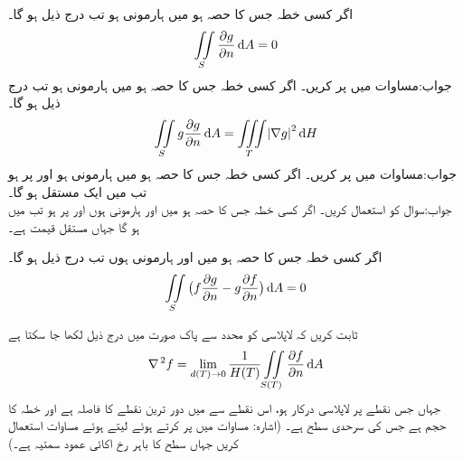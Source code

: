 \quad اگر کسی خطہ جس کا  حصہ ہو  میں  ہارمونی ہو تب درج ذیل ہو گا۔
\begin{align*}
\iint\limits_S \frac{\partial g}{\partial n}\dif A=0
\end{align*}
جواب:\quad مساوات  میں  پر کریں۔
\quad اگر کسی خطہ جس کا  حصہ ہو  میں  ہارمونی ہو تب درج ذیل ہو گا۔
\begin{align*}
\iint\limits_S g\frac{\partial g}{\partial n}\dif A=\iiint \limits_T \abs{\nabla g}^2 \dif H
\end{align*}
جواب:\quad مساوات  میں  پر کریں۔
\quad اگر کسی خطہ جس کا  حصہ ہو  میں  ہارمونی ہو  اور  پر   ہو  تب  میں  ایک مستقل ہو گا۔ \\
جواب:\quad سوال  کو استعمال کریں۔
\quad  اگر کسی خطہ جس کا  حصہ ہو  میں  اور  ہارمونی ہوں اور  پر  ہو تب  میں  ہو گا جہاں  مستقل قیمت ہے۔

\quad  اگر کسی خطہ جس کا  حصہ ہو  میں  اور  ہارمونی ہوں تب درج ذیل ہو گا۔
\begin{align*}
\iint\limits_S \big(f\frac{\partial g}{\partial n}-g\frac{\partial f}{\partial n}\big)\dif A=0
\end{align*}

\quad ثابت کریں کہ لاپلاسی کو محدد سے پاک صورت میں درج ذیل لکھا جا سکتا ہے
\begin{align*}
\nabla^{\,2}f=\lim_{d(T)\to 0}\frac{1}{H(T)}\iint\limits_{S(T)} \frac{\partial f}{\partial n}\dif A
\end{align*}
جہاں جس نقطے پر لاپلاسی درکار ہو، اس نقطے سے  میں دور ترین نقطے کا فاصلہ  ہے اور  خطہ  کا حجم ہے جس کی سرحدی سطح  ہے۔ (اشارہ: مساوات  میں  پر کرتے ہوئے  لیتے ہوئے مساوات  استعمال کریں جہاں  سطح  کا باہر رخ اکائی عمود سمتیہ ہے۔)

